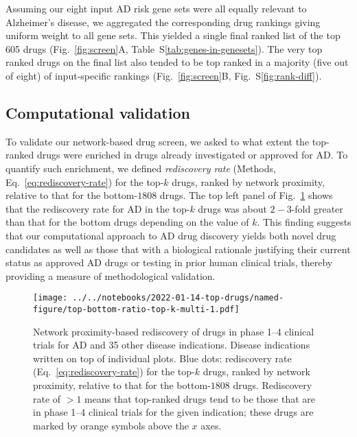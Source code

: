 \documentclass[letterpaper]{article}
\begin{document}
Assuming our eight input AD risk gene sets were all equally relevant to Alzheimer's
disease, we aggregated the corresponding drug rankings giving uniform weight
to all gene sets.  This yielded a single final ranked list of the top 605
drugs (Fig.~\ref{fig:screen}A, Table~S\ref{tab:genes-in-genesets}).  The very
top ranked drugs on the final list also tended to be top ranked in a majority
(five out of eight) of input-specific rankings (Fig.~\ref{fig:screen}B,
Fig.~S\ref{fig:rank-diff}).

\subsection{Computational validation}

To validate our network-based drug screen, we asked to what extent the
top-ranked drugs were enriched in drugs already investigated or approved for
AD.  To quantify such enrichment, we defined \emph{rediscovery rate} (Methods,
Eq.~\ref{eq:rediscovery-rate}) for the top-$k$ drugs, ranked by network
proximity, relative to that for the bottom-$1808$ drugs.  The top left panel
of Fig.~\ref{fig:ad-drug-rediscovery-multi} shows that the rediscovery rate
for AD in the top-$k$ drugs was about $2-3$-fold greater than that for the
bottom drugs depending on the value of $k$.  This finding suggests that our
computational approach to AD drug discovery yields both novel drug candidates
as well as those that with a biological rationale justifying their current
status as approved AD drugs or testing in prior human clinical trials, thereby
providing a measure of methodological validation.

\begin{figure}[p]
\texttt{[image: ../../notebooks/2022-01-14-top-drugs/named-figure/top-bottom-ratio-top-k-multi-1.pdf]}
\caption{
Network proximity-based rediscovery of drugs in phase 1--4 clinical trials for
AD and 35 other disease indications.  Disease indications written on top of
individual plots.  Blue dots: rediscovery rate (Eq.~\ref{eq:rediscovery-rate})
for the top-$k$ drugs, ranked by network proximity, relative to that for the
bottom-$1808$ drugs.  Rediscovery rate of $>1$ means that top-ranked drugs
tend to be those that are in phase 1--4 clinical trials for the given
indication; these drugs are marked by orange symbols above the $x$ axes.
}
\label{fig:ad-drug-rediscovery-multi}
\end{figure}
\end{document}
